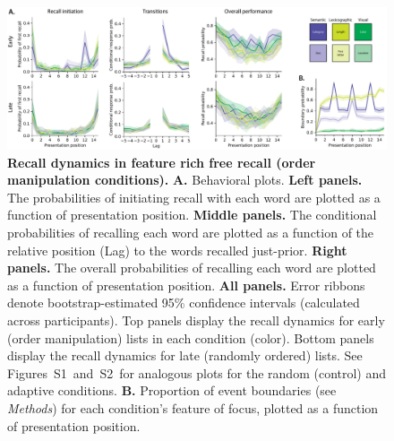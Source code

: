 \documentclass[11pt]{article}
\newcommand{\dynamicsRandom}{S1}
\newcommand{\dynamicsAdaptive}{S2}
\begin{document}
\begin{figure}[tp] \centering
\includegraphics[width=\textwidth]{figures/recall_dynamics}

\caption{\textbf{Recall dynamics in feature rich free recall (order
manipulation conditions).} \textbf{A.} Behavioral plots. \textbf{Left panels.}
The probabilities of initiating recall with each word are plotted as a function
of presentation position. \textbf{Middle panels.} The conditional probabilities
of recalling each word are plotted as a function of the relative position (Lag)
to the words recalled just-prior. \textbf{Right panels.} The overall
probabilities of recalling each word are plotted as a function of presentation
position. \textbf{All panels.} Error ribbons denote bootstrap-estimated 95\%
confidence intervals (calculated across participants). Top panels display the
recall dynamics for early (order manipulation) lists in each condition (color).
Bottom panels display the recall dynamics for late (randomly ordered) lists.
See Figures~\dynamicsRandom~and~\dynamicsAdaptive~for analogous plots for the
random (control) and adaptive conditions. \textbf{B.} Proportion of event
boundaries (see \textit{Methods}) for each condition's feature of focus,
plotted as a function of presentation position.}

    \label{fig:recall-dynamics}
\end{figure}
\end{document}
